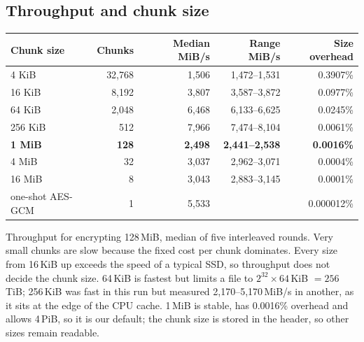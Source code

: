 \documentclass[11pt,a4paper]{article}
\begin{document}
\subsection{Throughput and chunk size}
\begin{center}
\begin{tabular}{lrrrr}
\toprule
Chunk size & Chunks & Median MiB/s & Range MiB/s & Size overhead\\
\midrule
4 KiB & 32,768 & 1,506 & 1,472--1,531 & 0.3907\%\\
16 KiB & 8,192 & 3,807 & 3,587--3,872 & 0.0977\%\\
64 KiB & 2,048 & 6,468 & 6,133--6,625 & 0.0245\%\\
256 KiB & 512 & 7,966 & 7,474--8,104 & 0.0061\%\\
\textbf{1 MiB} & \textbf{128} & \textbf{2,498} & \textbf{2,441--2,538} & \textbf{0.0016\%}\\
4 MiB & 32 & 3,037 & 2,962--3,071 & 0.0004\%\\
16 MiB & 8 & 3,043 & 2,883--3,145 & 0.0001\%\\
one-shot AES-GCM & 1 & 5,533 & & 0.000012\%\\
\bottomrule
\end{tabular}
\end{center}
Throughput for encrypting 128\,MiB, median of five interleaved rounds. Very small chunks are slow because the fixed cost per chunk dominates. Every size from 16\,KiB up exceeds the speed of a typical SSD, so throughput does not decide the chunk size. 64\,KiB is fastest but limits a file to $2^{32}\times 64$\,KiB $=256$\,TiB; 256\,KiB was fast in this run but measured 2,170--5,170\,MiB/s in another, as it sits at the edge of the CPU cache. 1\,MiB is stable, has 0.0016\% overhead and allows 4\,PiB, so it is our default; the chunk size is stored in the header, so other sizes remain readable.
\end{document}
